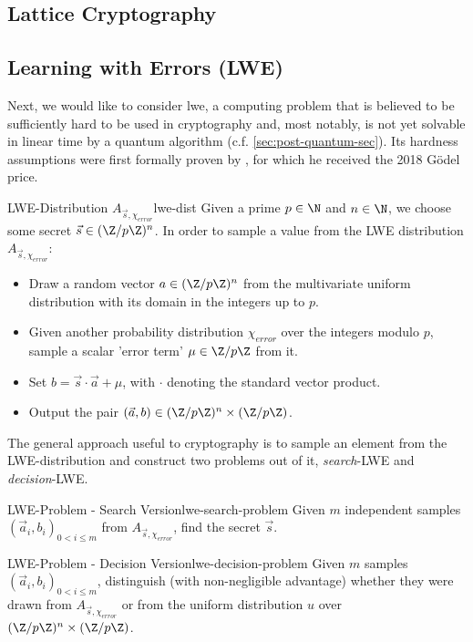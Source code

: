 \subsection{Lattice Cryptography}

\subsection{Learning with Errors (LWE)}
\label{subsec:lwe}
Next, we would like to consider \Gls{lwe}, a computing problem that is believed to be sufficiently hard
to be used in cryptography and, most notably, is not yet solvable in linear time by a quantum algorithm
(c.f. \autoref{sec:post-quantum-sec}).
Its hardness assumptions were first formally proven by \citeauthor{2005-lwe-original},
for which he received the 2018 Gödel price.

\begin{definition}{LWE-Distribution $A_{\vec{s}, \chi_{error}}$}{lwe-dist}
  Given a prime $p \in \N$ and $n \in \N$, we choose some secret $\vec{s} \in (\Z / p \Z)^n$.
  In order to sample a value from the LWE distribution $A_{\vec{s}, \chi_{error}}$:
  \begin{itemize}
    \item Draw a random vector $a \in (\Z/p\Z)^n$ from the multivariate uniform distribution
          with its domain in the integers up to $p$.
    \item Given another probability distribution $\chi_{error}$ over the integers modulo $p$,
          sample a scalar 'error term' $\mu \in \Z / p \Z$ from it.
    \item Set $b = \vec{s} \cdot \vec{a} + \mu$, with $\cdot$ denoting the standard vector product.
    \item Output the pair $(\vec{a}, b) \in (\Z / p \Z)^n \times (\Z / p \Z)$.
  \end{itemize}
\end{definition}

The general approach useful to cryptography is to sample an element from the LWE-distribution and construct
two problems out of it, \textit{search}-LWE and \textit{decision}-LWE.

\begin{definition}{LWE-Problem - Search Version}{lwe-search-problem}
  Given $m$ independent samples $(\vec{a}_i, b_i)_{0 < i \leq m}$ from $A_{\vec{s}, \chi_{error}}$, find the secret $\vec{s}$.
\end{definition}
\begin{definition}{LWE-Problem - Decision Version}{lwe-decision-problem}
  Given $m$ samples $(\vec{a}_i, b_i)_{0 < i \leq m}$, distinguish (with non-negligible advantage)
  whether they were drawn from $A_{\vec{s}, \chi_{error}}$ or from the uniform distribution
  $u$ over $(\Z / p \Z)^n \times (\Z / p \Z)$.
\end{definition}

